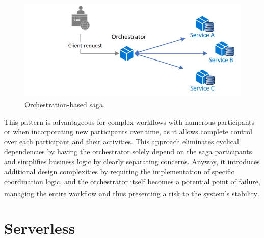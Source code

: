 \begin{figure}
    \centering
    \includegraphics[scale=0.55]{Pictures/3_orchestrator.png}
    \caption{Orchestration-based saga\textsuperscript{\cite{ms_sagas}}.}
    \label{fig:3_orchestration}
\end{figure}

This pattern is advantageous for complex workflows with numerous participants or when incorporating
new participants over time, as it allows complete control over each participant and their
activities. This approach eliminates cyclical dependencies by having the orchestrator solely depend
on the saga participants and simplifies business logic by clearly separating concerns. Anyway, it
introduces additional design complexities by requiring the implementation of specific coordination
logic, and the orchestrator itself becomes a potential point of failure, managing the entire
workflow and thus presenting a risk to the system's stability\textsuperscript{\cite{ms_sagas}}.

\section{Serverless}

